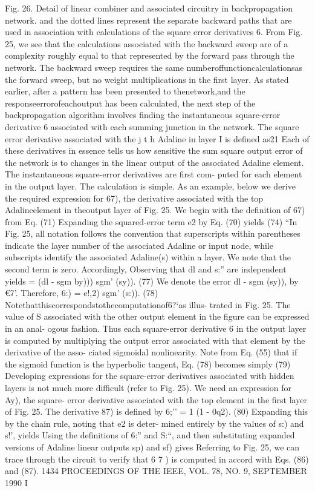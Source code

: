 Fig. 26. Detail of linear combiner and associated circuitry in
backpropagation network. and the dotted lines represent the separate
backward paths that are used in association with calculations of the
square error derivatives 6. From Fig. 25, we see that the calculations
associated with the backward sweep are of a complexity roughly equal to
that represented by the forward pass through the network. The backward
sweep requires the same numberoffunctioncalculationsas the forward
sweep, but no weight multiplications in the first layer. As stated
earlier, after a pattern has been presented to thenetwork,and the
responseerrorofeachoutput has been calculated, the next step of the
backpropagation algorithm involves finding the instantaneous
square-error derivative 6 associated with each summing junction in the
network. The square error derivative associated with the j t h Adaline
in layer I is defined as21 Each of these derivatives in essence tells us
how sensitive the sum square output error of the network is to changes
in the linear output of the associated Adaline element. The
instantaneous square-error derivatives are first com- puted for each
element in the output layer. The calculation is simple. As an example,
below we derive the required expression for 67), the derivative
associated with the top Adalineelement in theoutput layer of Fig. 25. We
begin with the definition of 67) from Eq. (71) Expanding the
squared-error term e2 by Eq. (70) yields (74) ``In Fig. 25, all notation
follows the convention that superscripts within parentheses indicate the
layer number of the associated Adaline or input node, while subscripts
identify the associated Adaline(s) within a layer. We note that the
second term is zero. Accordingly, Observing that dl and s:'' are
independent yields = (dl - sgm by))) sgm' (sy)). (77) We denote the
error dl - sgm (sy)), by €7'. Therefore, 6:) = e!,2) sgm' (s:)). (78)
Notethatthiscorrespondstothecomputationof6?`as illus- trated in Fig. 25.
The value of S associated with the other output element in the figure
can be expressed in an anal- ogous fashion. Thus each square-error
derivative 6 in the output layer is computed by multiplying the output
error associated with that element by the derivative of the asso- ciated
sigmoidal nonlinearity. Note from Eq. (55) that if the sigmoid function
is the hyperbolic tangent, Eq. (78) becomes simply (79) Developing
expressions for the square-error derivatives associated with hidden
layers is not much more difficult (refer to Fig. 25). We need an
expression for Ay), the square- error derivative associated with the top
element in the first layer of Fig. 25. The derivative 87) is defined by
6;'' = 1 (1 - 0q2). (80) Expanding this by the chain rule, noting that
e2 is deter- mined entirely by the values of s:) and s!', yields Using
the definitions of 6:'' and S:``, and then substituting expanded
versions of Adaline linear outputs sp) and sf) gives Referring to Fig.
25, we can trace through the circuit to verify that 6 7 ) is computed in
accord with Eqs. (86) and (87). 1434 PROCEEDINGS OF THE IEEE, VOL. 78,
NO. 9, SEPTEMBER 1990 I \textsubscript{}


